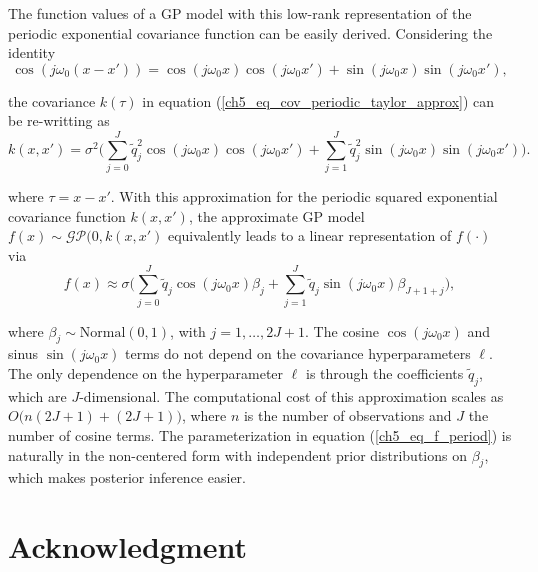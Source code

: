 \documentclass[onecolumn,a4paper,11pt]{article}
\begin{document}
The function values of a GP model with this low-rank representation of the periodic exponential covariance function can be easily derived. Considering the identity
%
\begin{equation*}
\cos(j\omega_0 (x-x'))=\cos(j\omega_0 x) \cos(j\omega_0 x') + \sin(j\omega_0 x) \sin(j\omega_0 x'),
\end{equation*}

\noindent the covariance $k(\tau)$ in equation (\ref{ch5_eq_cov_periodic_taylor_approx}) can be re-writting as
%
\begin{equation} \label{ch5_eq_cov_periodic_taylor_approx_2}
k(x,x')= \sigma^2 \Big( \sum_{j=0}^{J} \tilde{q}_j^2 \cos(j\omega_0 x)  \cos(j\omega_0 x') + \sum_{j=1}^{J} \tilde{q}_j^2 \sin(j\omega_0 x) \sin(j\omega_0 x') \Big).
\end{equation}

\noindent where $\tau=x-x'$. With this approximation for the periodic squared exponential covariance function $k(x,x')$, the approximate GP model $f(x) \sim \mathcal{GP}(0,k(x,x')$ equivalently leads to a linear representation of $f(\cdot)$ via
%
\begin{equation} \label{ch5_eq_f_period}
f(x) \approx \sigma \Big( \sum_{j=0}^J  \tilde{q}_j \cos(j\omega_0 x) \beta_j +  \sum_{j=1}^J \tilde{q}_j \sin(j\omega_0 x) \beta_{J+1+j} \Big),
\end{equation}

\noindent where $\beta_j \sim \text{Normal}(0,1)$, with $j=1,\dots,2J+1$. The cosine $\cos(j\omega_0 x)$ and sinus $\sin(j\omega_0 x)$ terms do not depend on the covariance hyperparameters $\ell$. The only dependence on the hyperparameter $\ell$ is through the coefficients $\tilde{q}_j$, which are $J$-dimensional. The computational cost of this approximation scales as $O\big(n(2J+1) + (2J+1)\big)$, where $n$ is the number of observations and $J$ the number of cosine terms.
The parameterization in equation (\ref{ch5_eq_f_period}) is naturally in the non-centered form with independent prior distributions on
$\beta_j$, which makes posterior inference easier.



\section*{Acknowledgment}



\end{document}
